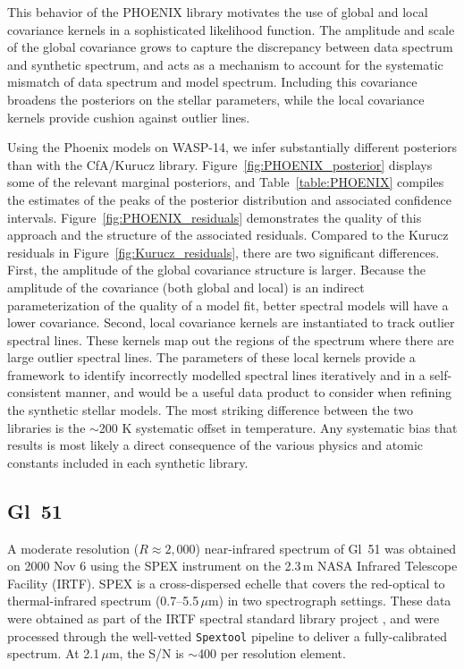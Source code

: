 \documentclass[iop,floatfix]{emulateapj}
\begin{document}
This behavior of the {\sc PHOENIX} library motivates the use of global and local covariance kernels in a sophisticated likelihood function. The amplitude and scale of the global covariance grows to capture the discrepancy between data spectrum and synthetic spectrum, and acts as a mechanism to account for the systematic mismatch of data spectrum and model spectrum. Including this covariance broadens the posteriors on the stellar parameters, while the local covariance kernels provide cushion against outlier lines.  

Using the {\sc Phoenix} models on WASP-14, we infer substantially different posteriors than with the {\sc CfA/Kurucz} library. Figure~\ref{fig:PHOENIX_posterior} displays some of the relevant marginal posteriors, and Table~\ref{table:PHOENIX} compiles the estimates of the peaks of the posterior distribution and associated confidence intervals. Figure~\ref{fig:PHOENIX_residuals} demonstrates the quality of this approach and the structure of the associated residuals. Compared to the Kurucz residuals in Figure~\ref{fig:Kurucz_residuals}, there are two significant differences. First, the amplitude of the global covariance structure is larger. Because the amplitude of the covariance (both global and local) is an indirect parameterization of the quality of a model fit, better spectral models will have a lower covariance. Second, local covariance kernels are instantiated to track outlier spectral lines. These kernels map out the regions of the spectrum where there are large outlier spectral lines. The parameters of these local kernels provide a framework to identify incorrectly modelled spectral lines iteratively and in a self-consistent manner, and would be a useful data product to consider when refining the synthetic stellar models. The most striking difference between the two libraries is the $\sim$200 K systematic offset in temperature. Any systematic bias that results is most likely a direct consequence of the various physics and atomic constants included in each synthetic library.

\subsection{Gl~51}

A moderate resolution ($R\approx2,000$) near-infrared spectrum of Gl~51 was obtained on 2000 
Nov 6 using the SPEX instrument \citep{rayner03} on the 2.3\,m NASA Infrared Telescope Facility 
(IRTF).  SPEX is a cross-dispersed echelle that covers the red-optical to thermal-infrared spectrum 
(0.7--5.5\,$\mu$m) in two spectrograph settings.  These data were obtained as part of the IRTF 
spectral standard library project \citep{cushing05,rayner09}, and were processed through the 
well-vetted {\tt Spextool} pipeline \citep{cushing04,vacca03} to deliver a fully-calibrated 
spectrum.  At 2.1\,$\mu$m, the S/N is $\sim$400 per resolution element.
\end{document}
